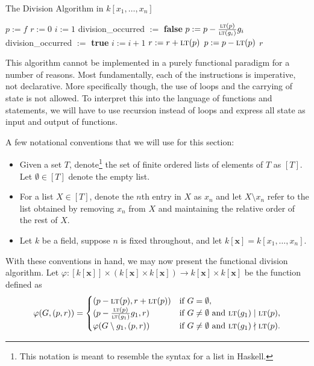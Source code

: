 \documentclass[MS, xcolor=dvipsnames]{wfuthesis}
\newcommand{\LT}{\ensuremath{\text{\sc lt}}}
\def\and{\text{ and }}
\theoremstyle{definition}
\def\p{\varphi}
\begin{document}
\begin{algorithm}
\caption{The Division Algorithm in $k[x_1,\dots,x_n]$}
\begin{algorithmic}
  \State $p:= f$
  \State $r:= 0$
    \State $i:= 1$
    \State division\_occurred $:=$ \textbf{false}
      \If{($\LT(g_i)$ divides $\LT(p)$)}
        \State $p := p - \frac{\LT(p)}{\LT(g_i)}g_i$
        \State division\_occurred $:=$ \textbf{true}
      \Else
        \State $i:= i+1$
      \EndIf
    \EndWhile
      \State $r := r + \LT(p)$
      \State $p := p - \LT(p)$
    \EndIf
  \EndWhile
  \State \Return $r$
\end{algorithmic}
\end{algorithm}
This algorithm cannot be implemented in a purely functional paradigm for a number of reasons. Most fundamentally, each of the instructions is imperative, not declarative. More specifically though, the use of loops and the carrying of state is not allowed. To interpret this into the language of functions and statements, we will have to use recursion instead of loops and express all state as input and output of functions. \par
A few notational conventions that we will use for this section:
\begin{itemize}
  \item Given a set $T$, denote\footnote{This notation is meant to resemble the syntax for a list in Haskell.} the set of finite ordered lists of elements of $T$ as $[T]$. Let $\emptyset \in [T]$ denote the empty list.
  \item For a list $X \in [T]$, denote the $n$th entry in $X$ as $x_n$ and let $X \setminus x_n$ refer to the list obtained by removing $x_n$ from $X$ and maintaining the relative order of the rest of $X$.
  \item Let $k$ be a field, suppose $n$ is fixed throughout, and let $k[\mathbf x] = k[x_1,\dots,x_n]$.
\end{itemize}
With these conventions in hand, we may now present the functional division algorithm. Let $\p: [k[\mathbf x]] \times \left( k[\mathbf x] \times k[\mathbf x] \right) \to k[\mathbf x] \times k[\mathbf x]$ be the function defined as
\[ \p(G,(p,r)) = \begin{cases} (p-\LT(p),r+\LT(p)) &\text{if } G = \emptyset, \\ (p-\frac{\LT(p)}{\LT(g_1)}g_1,r) &\text{if } G \ne \emptyset \and \LT(g_1) \mid \LT(p), \\ \p(G\setminus g_1,(p,r)) &\text{if } G \ne \emptyset \and \LT(g_1) \nmid \LT(p). \end{cases} \]
\end{document}
